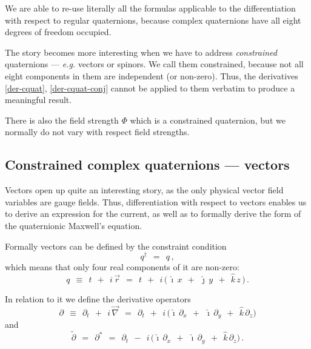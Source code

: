 \documentclass[epsfig,12pt]{article}
\newcommand{\p}{\partial}
\newcommand{\wt}{\widetilde}
\newcommand{\ii}{\hat\imath}
\newcommand{\jj}{\hat\jmath}
\newcommand{\kk}{\hat k}
\begin{document}
	We are able to re-use literally all the formulas applicable to the differentiation
	with respect to regular quaternions, because complex quaternions have all
	eight degrees of freedom occupied.

	The story becomes more interesting when we have to address \emph{constrained}
	quaternions --- \emph{e.g.} vectors or spinors.
	We call them constrained, because not all eight components in them are independent
	(or non-zero).
	Thus, the derivatives \eqref{der-cquat}, \eqref{der-cquat-conj} cannot be applied to
	them verbatim to produce a meaningful result.

	There is also the field strength $ \Phi $ which is a constrained quaternion,
	but we normally do not vary with respect field strengths.
	

\subsection{Constrained complex quaternions --- vectors}

	Vectors open up quite an interesting story, as the only physical vector
	field variables are gauge fields.
	Thus, differentiation with respect to vectors enables us to derive
	an expression for the current, as well as to formally derive the form 
	of the quaternionic Maxwell's equation.

	Formally vectors can be defined by the constraint condition
\begin{equation}
	q^\dag	~~=~~	q\,,
\end{equation}
	which means that only four real components of it are non-zero:
\begin{equation}
	q	~~\equiv~~	t  ~~+~~  i\,\vec r
		~~=~~		t  ~~+~~  i\,\big(\, \ii\,x  ~~+~~  \jj\,y  ~~+~~  \kk\,z \,\big)\,.
\end{equation}

	In relation to it we define the derivative operators
\begin{equation}
	\p	~~\equiv~~	\p_t  ~~+~~  i\,\vec\nabla
		~~=~~		\p_t  ~~+~~  i\,\big( \ii\,\p_x  ~~+~~  \ii\,\p_y  ~~+~~  \kk\,\p_z \big)
\end{equation}
	and
\begin{equation}
	\wt\p	~~=~~	\p^*
		~~=~~	\p_t  ~~-~~  i\,\big( \ii\,\p_x  ~~+~~  \ii\,\p_y  ~~+~~  \kk\,\p_z \big)\,.
\end{equation}
\end{document}
